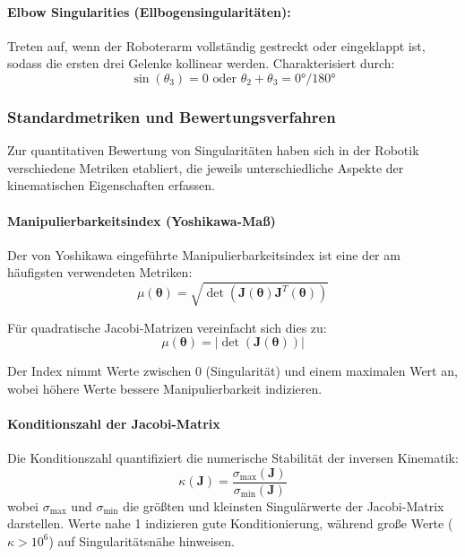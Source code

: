 \paragraph{Elbow Singularities (Ellbogensingularitäten):}
Treten auf, wenn der Roboterarm vollständig gestreckt oder eingeklappt ist,
sodass die ersten drei Gelenke kollinear werden. Charakterisiert durch:
\begin{equation}
    \sin(\theta_3) = 0 \text{ oder } \theta_2 + \theta_3 = 0°/180°
    \label{eq:elbow_singularity}
\end{equation}
\subsubsection{Standardmetriken und Bewertungsverfahren}
\label{sssec:Singularitaets_Metriken}

Zur quantitativen Bewertung von Singularitäten haben sich in der Robotik
verschiedene Metriken etabliert, die jeweils unterschiedliche Aspekte der
kinematischen Eigenschaften erfassen.

\paragraph{Manipulierbarkeitsindex (Yoshikawa-Maß)}
Der von Yoshikawa \cite{yoshikawa1985manipulability} eingeführte
Manipulierbarkeitsindex ist eine der am häufigsten verwendeten Metriken:
\begin{equation}
    \mu(\boldsymbol{\theta}) = \sqrt{\det(\mathbf{J}(\boldsymbol{\theta})\mathbf{J}^T(\boldsymbol{\theta}))}
    \label{eq:yoshikawa_measure}
\end{equation}

Für quadratische Jacobi-Matrizen vereinfacht sich dies zu:
\begin{equation}
    \mu(\boldsymbol{\theta}) = |\det(\mathbf{J}(\boldsymbol{\theta}))|
    \label{eq:yoshikawa_simplified}
\end{equation}

Der Index nimmt Werte zwischen 0 (Singularität) und einem maximalen Wert an,
wobei höhere Werte bessere Manipulierbarkeit indizieren.

\paragraph{Konditionszahl der Jacobi-Matrix}
Die Konditionszahl quantifiziert die numerische Stabilität der inversen
Kinematik:
\begin{equation}
    \kappa(\mathbf{J}) = \frac{\sigma_{\text{max}}(\mathbf{J})}{\sigma_{\text{min}}(\mathbf{J})}
    \label{eq:condition_number}
\end{equation}
wobei $\sigma_{\text{max}}$ und $\sigma_{\text{min}}$ die größten und kleinsten Singulärwerte der Jacobi-Matrix darstellen. Werte nahe 1 indizieren gute Konditionierung, während große Werte ($\kappa > 10^6$) auf Singularitätsnähe hinweisen.

